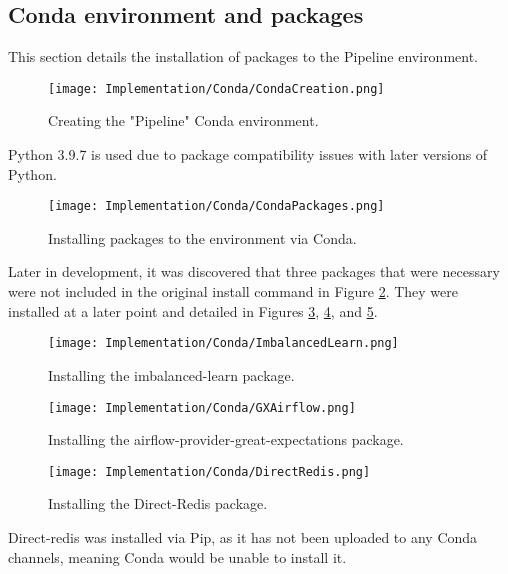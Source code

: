 \subsection{Conda environment and packages}
This section details the installation of packages to the Pipeline environment.

\begin{figure}[H]
    \centering
    \texttt{[image: Implementation/Conda/CondaCreation.png]}
    \caption{Creating the "Pipeline" Conda environment.}
    \label{fig:CondaCreation}
\end{figure}

\para Python 3.9.7 is used due to package compatibility issues with later versions of Python.

\begin{figure}[H]
    \centering
    \texttt{[image: Implementation/Conda/CondaPackages.png]}
    \caption{Installing packages to the environment via Conda.}
    \label{fig:CondaPackages}
\end{figure}

\para Later in development, it was discovered that three packages that were necessary were not included 
in the original install command in Figure \ref{fig:CondaPackages}. They were installed at a later point and 
detailed in Figures \ref{fig:imbLearnInstall}, \ref{fig:AirflowGXInstall}, and \ref{fig:directRedisInstall}.

\begin{figure}[H]
    \centering
    \texttt{[image: Implementation/Conda/ImbalancedLearn.png]}
    \caption{Installing the imbalanced-learn package.}
    \label{fig:imbLearnInstall}
\end{figure}

\begin{figure}[H]
    \centering
    \texttt{[image: Implementation/Conda/GXAirflow.png]}
    \caption{Installing the airflow-provider-great-expectations package.}
    \label{fig:AirflowGXInstall}
\end{figure}

\begin{figure}[H]
    \centering
    \texttt{[image: Implementation/Conda/DirectRedis.png]}
    \caption{Installing the Direct-Redis package.}
    \label{fig:directRedisInstall}
\end{figure}

\para Direct-redis was installed via Pip, as it has not been uploaded to any Conda
channels, meaning Conda would be unable to install it.

